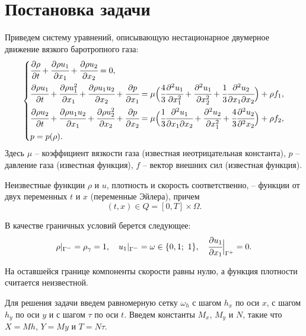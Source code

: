 
\section{Постановка задачи} \label{sec:1-postanovka-zadachi}
Приведем систему уравнений, описывающую нестационарное двумерное движение вязкого баротропного газа:
\begin{equation}
\left\{
	\begin{aligned}
    	&\cfrac{\partial \rho}{\partial t} + \cfrac{\partial \rho u_1}{\partial x_1}+ \cfrac{\partial \rho u_2}{\partial x_2} = 0, \\
	    & 
\cfrac{\partial \rho u_1}{\partial t} + \cfrac{\partial \rho u_1^2}{\partial x_1} + \cfrac{\partial \rho u_1 u_2}{\partial x_2} 
	+ \cfrac{\partial p}{\partial x_1} 
	= \mu \Big(\cfrac{4}{3}\cfrac{\partial^2 u_1}{\partial x_1^2} + \cfrac{\partial^2 u_1}{\partial x_2^2}
	+  \cfrac{1}{3}\cfrac{\partial^2 u_2}{\partial x_1\partial x_2} \Big) + \rho f_1, \\
		&
\cfrac{\partial \rho u_2}{\partial t} + \cfrac{\partial \rho u_1 u_2}{\partial x_1} + \cfrac{\partial \rho u_2^2}{\partial x_2}
	+ \cfrac{\partial p}{\partial x_2} 
	= \mu \Big(\cfrac{1}{3}\cfrac{\partial^2 u_1}{\partial x_1\partial x_2} + \cfrac{\partial^2 u_2}{\partial x_1^2}
	+  \cfrac{4}{3}\cfrac{\partial^2 u_2}{\partial^2 x_2} \Big) + \rho f_2, \\
    	& p = p (\rho).
	\end{aligned}
\right.
\label{eq:1-nachal-zadacha}
\end{equation}
Здесь $\mu$ -- коэффициент вязкости газа (известная неотрицательная константа), $p$ -- давление газа (известная функция), $f$ -- вектор внешних сил (известная функция).

Неизвестные функции $\rho$ и $u$, плотность и скорость соответственно, -- функции от двух переменных $t$ и $x$ (переменные Эйлера), причем $$(t, x) \in Q = [0, T] \times \Omega.$$

В качестве граничных условий берется следующее:
\begin{equation}
\rho|_{\Gamma^-} = \rho_{\gamma} = 1,\quad u_1|_{\Gamma^-} = \omega \in \{0,1;\  1\},\quad \cfrac{\partial u_1}{\partial x_1}\Big|_{\Gamma^+} = 0. \label{eq:1-usl2}
\end{equation}

На оставшейся границе компоненты скорости равны нулю, а функция плотности считается неизвестной.

Для решения задачи введем равномерную сетку $\omega_h$ с шагом $h_x$ по оси $x$, с шагом $h_y$ по оси $y$ и с шагом $\tau$ по оси $t$. 
Введем константы $M_x$, $M_y$ и $N$, такие что $X = Mh$, $Y= My$ и $T = N\tau$.
